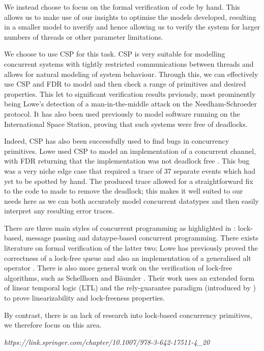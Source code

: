 We instead choose to focus on the formal verification of code by hand. This allows us to make use of our insights to optimise the models developed, resulting in a smaller model to nverify and hence allowing us to verify the system for larger numbers of threads or other parameter limitations.

We choose to use CSP for this task. CSP is very suitable for modelling concurrent systems with tightly restricted communications between threads \cite{Lawrence2005} and allows for natural modeling of system behaviour. Through this, we can effectively use CSP and FDR to model and then check a range of primitives and desired properties. This let to significant verification results prviously, most prominently being Lowe's detection of a man-in-the-middle attack on the Needham-Schroeder protocol\cite{LoweNeedham}. It has also been used previously to model software running on the International Space Station, proving that such systems were free of deadlocks\cite{DeadlockAnalysis}. 

Indeed, CSP has also been successfully used to find bugs in concurrency primitives. Lowe used CSP to model an implementation of a concurrent channel, with FDR returning that the implementation was not deadlock free \cite{LoweDeadlock}. This bug was a very niche edge case that required a trace of 37 separate events which had yet to be spotted by hand. The produced trace allowed for a straightforward fix to the code to made to remove the deadlock; this makes it well suited to our needs here as we can both accurately model concurrent datatypes and then easily interpret any resulting error traces.

There are three main styles of concurrent programming as highlighted in \cite{CADS}: lock-based, message passing and dataype-based concurrent programming. There exists literature on formal verification of the latter two; Lowe has previously proved the correctness of a lock-free queue\cite{LFQueue} and also an implementation of a generalised alt operator \cite{LoweAlt}. There is also more general work on the verification of lock-free algorithms, such as Schellhorn and B{\"a}umler \cite{Schellhorn}. Their work uses an extended form of linear temporal logic (LTL) and the rely-guarantee paradigm (introduced by \cite{Jones}) to prove linearizability and lock-freeness properties. 

By contrast, there is an lack of research into lock-based concurrency primitives, we therefore focus on this area.

\emph{https://link.springer.com/chapter/10.1007/978-3-642-17511-4\_20}



